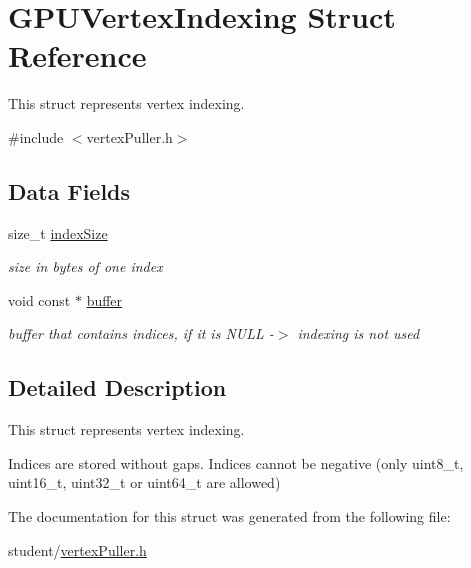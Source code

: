 \hypertarget{structGPUVertexIndexing}{\section{G\-P\-U\-Vertex\-Indexing Struct Reference}
\label{structGPUVertexIndexing}
}


This struct represents vertex indexing.  




{\ttfamily \#include $<$vertex\-Puller.\-h$>$}

\subsection*{Data Fields}
\begin{DoxyCompactItemize}
\item 
\hypertarget{structGPUVertexIndexing_a1b260729afe6762ababfd5c9ace859a2}{size\-\_\-t \hyperlink{structGPUVertexIndexing_a1b260729afe6762ababfd5c9ace859a2}{index\-Size}}\label{structGPUVertexIndexing_a1b260729afe6762ababfd5c9ace859a2}

\begin{DoxyCompactList}\small\item\em size in bytes of one index \end{DoxyCompactList}\item 
\hypertarget{structGPUVertexIndexing_af34bf3d9f481e8b118f43e500fb33684}{void const $\ast$ \hyperlink{structGPUVertexIndexing_af34bf3d9f481e8b118f43e500fb33684}{buffer}}\label{structGPUVertexIndexing_af34bf3d9f481e8b118f43e500fb33684}

\begin{DoxyCompactList}\small\item\em buffer that contains indices, if it is N\-U\-L\-L -\/$>$ indexing is not used \end{DoxyCompactList}\end{DoxyCompactItemize}


\subsection{Detailed Description}
This struct represents vertex indexing. 

Indices are stored without gaps. Indices cannot be negative (only uint8\-\_\-t, uint16\-\_\-t, uint32\-\_\-t or uint64\-\_\-t are allowed) 

The documentation for this struct was generated from the following file\-:\begin{DoxyCompactItemize}
\item 
student/\hyperlink{vertexPuller_8h}{vertex\-Puller.\-h}\end{DoxyCompactItemize}
